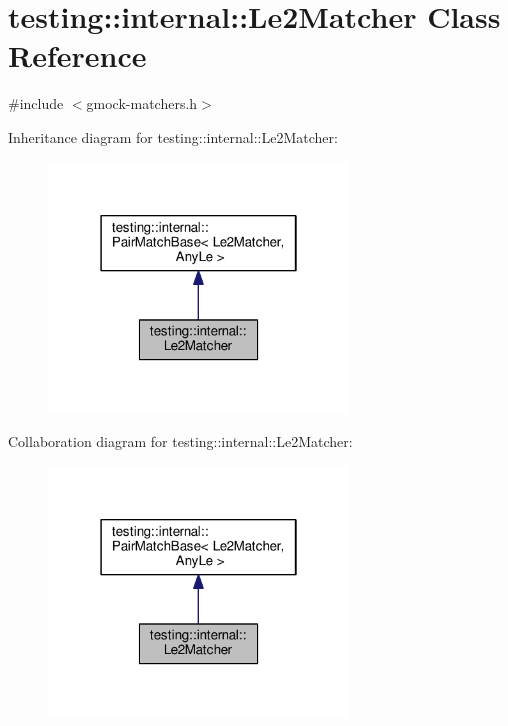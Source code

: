 \hypertarget{classtesting_1_1internal_1_1Le2Matcher}{}\section{testing\+:\+:internal\+:\+:Le2\+Matcher Class Reference}
\label{classtesting_1_1internal_1_1Le2Matcher}


{\ttfamily \#include $<$gmock-\/matchers.\+h$>$}



Inheritance diagram for testing\+:\+:internal\+:\+:Le2\+Matcher\+:
\nopagebreak
\begin{figure}[H]
\begin{center}
\leavevmode
\includegraphics[width=226pt]{classtesting_1_1internal_1_1Le2Matcher__inherit__graph}
\end{center}
\end{figure}


Collaboration diagram for testing\+:\+:internal\+:\+:Le2\+Matcher\+:
\nopagebreak
\begin{figure}[H]
\begin{center}
\leavevmode
\includegraphics[width=226pt]{classtesting_1_1internal_1_1Le2Matcher__coll__graph}
\end{center}
\end{figure}
